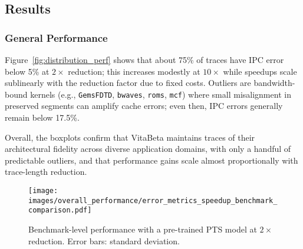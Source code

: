 \documentclass[conference]{IEEEtran}
\begin{document}
\begin{figure*}[!htbp] 
    \centering
    \caption{Error distributions for $2\times$, $4\times$, and $10\times$ reductions on SPEC2006/2017, GAP, and server workloads using a pre-trained PTS model. Average speedups: $1.9\times$, $3.9\times$, $9.2\times$. \textit{\small Note: Unless stated otherwise, results in the section use an ImputeFormer pre-trained on a 10B-instruction \texttt{bfs-10} trace.}}
    \label{fig:distribution_perf}
\end{figure*}


\subsection{Results}
\subsubsection*{General Performance}
Figure~\ref{fig:distribution_perf} shows that about 75\% of traces have IPC error below 5\% at $2\times$ reduction; this increases modestly at $10\times$ while speedups scale sublinearly with the reduction factor due to fixed costs. Outliers are bandwidth-bound kernels (e.g., \texttt{GemsFDTD}, \texttt{bwaves}, \texttt{roms}, \texttt{mcf}) where small misalignment in preserved segments can amplify cache errors; even then, IPC errors generally remain below 17.5\%.

Overall, the boxplots confirm that VitaBeta maintains traces of their architectural fidelity across diverse application domains, with only a handful of predictable outliers, and that performance gains scale almost proportionally with trace-length reduction.
\begin{figure}[!htbp]
    \centering
    \setlength{\belowcaptionskip}{-10pt}
    \captionsetup{skip=3pt}
    \captionsetup[subfigure]{font=footnotesize, skip=1pt}
    \texttt{[image: images/overall\_performance/error\_metrics\_speedup\_benchmark\_comparison.pdf]}
    \caption{Benchmark-level performance with a pre-trained PTS model at $2\times$ reduction. Error bars: standard deviation.}
    \label{fig:benchmarks}
\end{figure}
\end{document}
